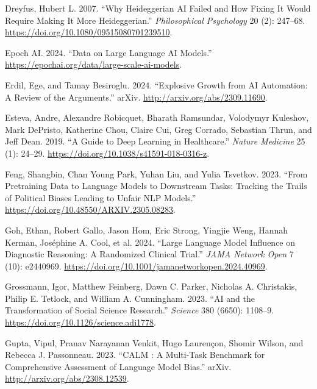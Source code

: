 \documentclass[
  Letterpaper,
]{scrbook}
\newlength{\cslhangindent}
\newenvironment{CSLReferences}[2] %
 {\begin{list}{}{%
  \setlength{\itemindent}{0pt}
  \setlength{\leftmargin}{0pt}
  \setlength{\parsep}{0pt}
  \ifodd #1
   \setlength{\leftmargin}{\cslhangindent}
   \setlength{\itemindent}{-1\cslhangindent}
  \fi
  \setlength{\itemsep}{#2\baselineskip}}}
 {\end{list}}
\begin{document}
\begin{CSLReferences}{1}{0}
Dreyfus, Hubert L. 2007. {``Why {Heideggerian} {AI} {Failed} and {How}
{Fixing} It {Would} {Require} {Making} It {More} {Heideggerian}.''}
\emph{Philosophical Psychology} 20 (2): 247--68.
\url{https://doi.org/10.1080/09515080701239510}.

Epoch AI. 2024. {``Data on {Large} {Language} {AI} {Models}.''}
\url{https://epochai.org/data/large-scale-ai-models}.

Erdil, Ege, and Tamay Besiroglu. 2024. {``Explosive Growth from {AI}
Automation: {A} Review of the Arguments.''} arXiv.
\url{http://arxiv.org/abs/2309.11690}.

Esteva, Andre, Alexandre Robicquet, Bharath Ramsundar, Volodymyr
Kuleshov, Mark DePristo, Katherine Chou, Claire Cui, Greg Corrado,
Sebastian Thrun, and Jeff Dean. 2019. {``A Guide to Deep Learning in
Healthcare.''} \emph{Nature Medicine} 25 (1): 24--29.
\url{https://doi.org/10.1038/s41591-018-0316-z}.

Feng, Shangbin, Chan Young Park, Yuhan Liu, and Yulia Tsvetkov. 2023.
{``From {Pretraining} {Data} to {Language} {Models} to {Downstream}
{Tasks}: {Tracking} the {Trails} of {Political} {Biases} {Leading} to
{Unfair} {NLP} {Models}.''}
\url{https://doi.org/10.48550/ARXIV.2305.08283}.

Goh, Ethan, Robert Gallo, Jason Hom, Eric Strong, Yingjie Weng, Hannah
Kerman, Joséphine A. Cool, et al. 2024. {``Large {Language} {Model}
{Influence} on {Diagnostic} {Reasoning}: {A} {Randomized} {Clinical}
{Trial}.''} \emph{JAMA Network Open} 7 (10): e2440969.
\url{https://doi.org/10.1001/jamanetworkopen.2024.40969}.

Grossmann, Igor, Matthew Feinberg, Dawn C. Parker, Nicholas A.
Christakis, Philip E. Tetlock, and William A. Cunningham. 2023. {``{AI}
and the Transformation of Social Science Research.''} \emph{Science} 380
(6650): 1108--9. \url{https://doi.org/10.1126/science.adi1778}.

Gupta, Vipul, Pranav Narayanan Venkit, Hugo Laurençon, Shomir Wilson,
and Rebecca J. Passonneau. 2023. {``{CALM} : {A} {Multi}-Task
{Benchmark} for {Comprehensive} {Assessment} of {Language} {Model}
{Bias}.''} arXiv. \url{http://arxiv.org/abs/2308.12539}.


\end{CSLReferences}
\end{document}
